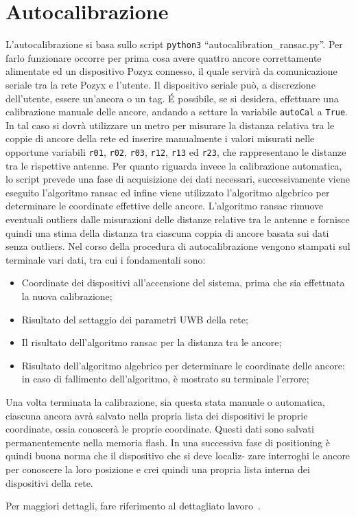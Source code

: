 \newpage
\appendix
\section{Autocalibrazione}
\label{sez:Autocalibrazione}
L'autocalibrazione si basa sullo script \texttt{python3} ``autocalibration\_ransac.py''. 
Per farlo funzionare occorre per prima cosa avere quattro ancore correttamente alimentate ed un dispositivo Pozyx connesso, il quale servirà da comunicazione seriale tra la rete Pozyx e l’utente. 
Il dispositivo seriale può, a discrezione dell’utente, essere un’ancora o un tag. 
É possibile, se si desidera, effettuare una calibrazione manuale delle ancore, andando a settare la variabile \verb|autoCal| a \verb|True|. 
In tal caso si dovrà utilizzare un metro per misurare la distanza relativa tra le coppie di ancore della rete ed inserire manualmente i valori misurati nelle opportune variabili \texttt{r01}, \texttt{r02}, \texttt{r03}, \texttt{r12}, \texttt{r13} ed \texttt{r23}, che rappresentano le distanze tra le rispettive antenne.
Per quanto riguarda invece la calibrazione automatica, lo script prevede una fase di acquisizione dei dati necessari, successivamente viene eseguito l’algoritmo ransac ed infine viene utilizzato l’algoritmo algebrico per determinare le coordinate effettive delle ancore. 
L’algoritmo ransac rimuove eventuali outliers dalle misurazioni delle distanze relative tra le antenne e fornisce quindi una stima della distanza tra ciascuna coppia di ancore basata sui dati senza outliers.
Nel corso della procedura di autocalibrazione vengono stampati sul terminale vari dati, tra cui i fondamentali sono:
\begin{itemize}
	\item Coordinate dei dispositivi all’accensione del sistema, prima che sia effettuata la nuova calibrazione;
	
	\item Risultato del settaggio dei parametri UWB della rete;
	
	\item Il risultato dell’algoritmo ransac per la distanza tra le ancore;
	
	\item Risultato dell'algoritmo algebrico per determinare le coordinate delle ancore: in caso di fallimento dell'algoritmo, \`e mostrato su terminale l'errore;
\end{itemize}

Una volta terminata la calibrazione, sia questa stata manuale o automatica, ciascuna ancora avrà
salvato nella propria lista dei dispositivi le proprie coordinate, ossia conoscerà le proprie coordinate. 
Questi dati sono salvati permanentemente nella memoria flash.
In una successiva fase di positioning è quindi buona norma che il dispositivo che si deve localiz-
zare interroghi le ancore per conoscere la loro posizione e crei quindi una propria lista interna dei
dispositivi della rete.


Per maggiori dettagli, fare riferimento al dettagliato lavoro~\cite{ctesconistudio}.

\newpage



